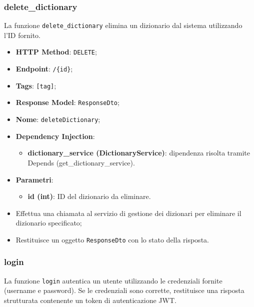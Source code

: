 \subsubsection{delete\_dictionary}

\par La funzione \texttt{delete\_dictionary} elimina un dizionario dal sistema utilizzando l'ID fornito.

  \begin{itemize}
  \item \textbf{HTTP Method}: \texttt{DELETE};
  \item \textbf{Endpoint}: \texttt{/\{id\}};
  \item \textbf{Tags}: \texttt{[tag]};
  \item \textbf{Response Model}: \texttt{ResponseDto};
  \item \textbf{Nome}: \texttt{deleteDictionary};
  \item \textbf{Dependency Injection}:
  \begin{itemize}
    \item \textbf{dictionary\_service (DictionaryService)}: dipendenza risolta tramite Depends (get\_dictionary\_service).
  \end{itemize}
  \item \textbf{Parametri}:
  \begin{itemize}
    \item \textbf{id (int)}: ID del dizionario da eliminare.
  \end{itemize}
\end{itemize}

\begin{itemize}
  \item Effettua una chiamata al servizio di gestione dei dizionari per eliminare il dizionario specificato;
  \item Restituisce un oggetto \texttt{ResponseDto} con lo stato della risposta.
\end{itemize}


\subsubsection{login}

\par La funzione \texttt{login} autentica un utente utilizzando le credenziali fornite (username e password). Se le credenziali sono corrette, restituisce una risposta strutturata contenente un token di autenticazione JWT.

